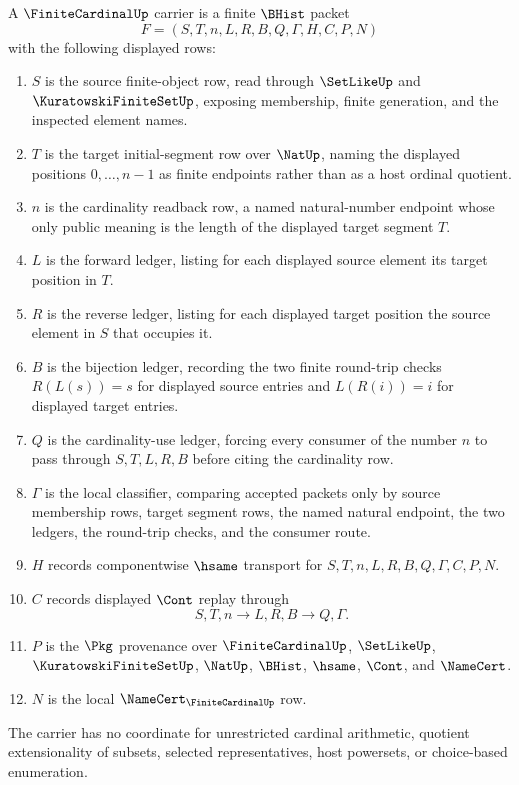 \begin{definition}
\label{def:finite-cardinal-carrier}
A $\FiniteCardinalUp$ carrier is a finite $\BHist$ packet
$$
F=(S,T,n,L,R,B,Q,\Gamma,H,C,P,N)
$$
with the following displayed rows:
\begin{enumerate}
\item $S$ is the source finite-object row, read through $\SetLikeUp$ and $\KuratowskiFiniteSetUp$, exposing membership, finite generation, and the inspected element names.
\item $T$ is the target initial-segment row over $\NatUp$, naming the displayed positions $0,\ldots,n-1$ as finite endpoints rather than as a host ordinal quotient.
\item $n$ is the cardinality readback row, a named natural-number endpoint whose only public meaning is the length of the displayed target segment $T$.
\item $L$ is the forward ledger, listing for each displayed source element its target position in $T$.
\item $R$ is the reverse ledger, listing for each displayed target position the source element in $S$ that occupies it.
\item $B$ is the bijection ledger, recording the two finite round-trip checks $R(L(s))=s$ for displayed source entries and $L(R(i))=i$ for displayed target entries.
\item $Q$ is the cardinality-use ledger, forcing every consumer of the number $n$ to pass through $S,T,L,R,B$ before citing the cardinality row.
\item $\Gamma$ is the local classifier, comparing accepted packets only by source membership rows, target segment rows, the named natural endpoint, the two ledgers, the round-trip checks, and the consumer route.
\item $H$ records componentwise $\hsame$ transport for $S,T,n,L,R,B,Q,\Gamma,C,P,N$.
\item $C$ records displayed $\Cont$ replay through
$$
S,T,n \longrightarrow L,R,B \longrightarrow Q,\Gamma .
$$
\item $P$ is the $\Pkg$ provenance over $\FiniteCardinalUp$, $\SetLikeUp$, $\KuratowskiFiniteSetUp$, $\NatUp$, $\BHist$, $\hsame$, $\Cont$, and $\NameCert$.
\item $N$ is the local $\NameCert_{\FiniteCardinalUp}$ row.
\end{enumerate}
The carrier has no coordinate for unrestricted cardinal arithmetic, quotient extensionality of subsets, selected representatives, host powersets, or choice-based enumeration.
\end{definition}

